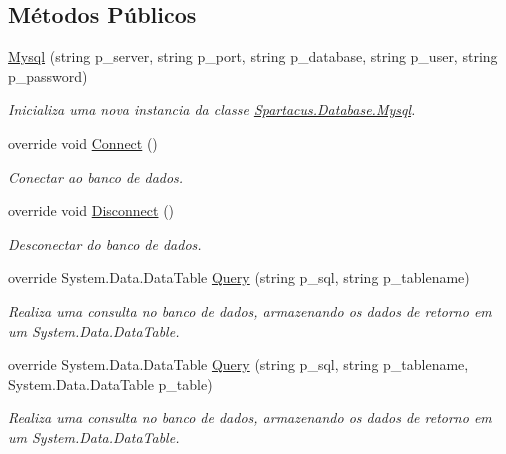 \subsection*{Métodos Públicos}
\begin{DoxyCompactItemize}
\item 
\hyperlink{classSpartacus_1_1Database_1_1Mysql_aa1a7b4639cb22e84da677a4186efa060}{Mysql} (string p\+\_\+server, string p\+\_\+port, string p\+\_\+database, string p\+\_\+user, string p\+\_\+password)
\begin{DoxyCompactList}\small\item\em Inicializa uma nova instancia da classe \hyperlink{classSpartacus_1_1Database_1_1Mysql}{Spartacus.\+Database.\+Mysql}. \end{DoxyCompactList}\item 
override void \hyperlink{classSpartacus_1_1Database_1_1Mysql_a5169783f95c51db388b841b4bd9207f5}{Connect} ()
\begin{DoxyCompactList}\small\item\em Conectar ao banco de dados. \end{DoxyCompactList}\item 
override void \hyperlink{classSpartacus_1_1Database_1_1Mysql_ab7000e1b5ceedaaeaf3c824e22ec1b14}{Disconnect} ()
\begin{DoxyCompactList}\small\item\em Desconectar do banco de dados. \end{DoxyCompactList}\item 
override System.\+Data.\+Data\+Table \hyperlink{classSpartacus_1_1Database_1_1Mysql_a3546716a22fd53251603f2ab36d34410}{Query} (string p\+\_\+sql, string p\+\_\+tablename)
\begin{DoxyCompactList}\small\item\em Realiza uma consulta no banco de dados, armazenando os dados de retorno em um System.\+Data.\+Data\+Table. \end{DoxyCompactList}\item 
override System.\+Data.\+Data\+Table \hyperlink{classSpartacus_1_1Database_1_1Mysql_a2b7f2096a3ee819670c49ed41cf04f75}{Query} (string p\+\_\+sql, string p\+\_\+tablename, System.\+Data.\+Data\+Table p\+\_\+table)
\begin{DoxyCompactList}\small\item\em Realiza uma consulta no banco de dados, armazenando os dados de retorno em um System.\+Data.\+Data\+Table. \end{DoxyCompactList}\item 

\end{DoxyCompactItemize}
